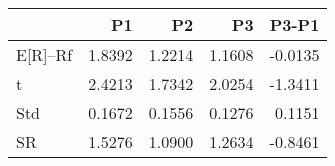 \begin{tabular}{lrrrr}
\toprule
 & P1 & P2 & P3 & P3-P1 \\
\midrule
E[R]--Rf & 1.8392 & 1.2214 & 1.1608 & -0.0135 \\
t & 2.4213 & 1.7342 & 2.0254 & -1.3411 \\
Std & 0.1672 & 0.1556 & 0.1276 & 0.1151 \\
SR & 1.5276 & 1.0900 & 1.2634 & -0.8461 \\
\bottomrule
\end{tabular}
